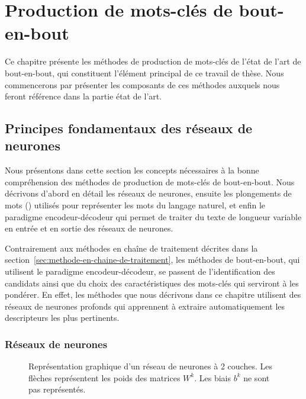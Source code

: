 \chapter{Production de mots-clés de bout-en-bout} \label{chap:kw_production}

Ce chapitre présente les méthodes de production de mots-clés de l'état de l'art de bout-en-bout, qui constituent l'élément principal de ce travail de thèse. 
Nous commencerons par présenter les composants de ces méthodes auxquels nous feront référence dans la partie état de l'art.

\section{Principes fondamentaux des réseaux de neurones}

Nous présentons dans cette section les concepts nécessaires à la bonne compréhension des méthodes de production de mots-clés de bout-en-bout.
Nous décrivons d'abord en détail les réseaux de neurones, ensuite les plongements de mots () utilisés pour représenter les mots du langage naturel, et enfin le paradigme encodeur-décodeur qui permet de traiter du texte de longueur variable en entrée et en sortie des réseaux de neurones.

Contrairement aux méthodes en chaîne de traitement décrites dans la section~\ref{sec:methode-en-chaine-de-traitement}, les méthodes de bout-en-bout, qui utilisent le paradigme encodeur-décodeur, se passent de l'identification des candidats ainsi que du choix des caractéristiques des mots-clés qui serviront à les pondérer.
En effet, les méthodes que nous décrivons dans ce chapitre utilisent des réseaux de neurones profonds qui apprennent à extraire automatiquement les descripteurs  les plus pertinents.


\subsection{Réseaux de neurones}
\label{sub:neural_network}

\begin{figure}
    \centering
    
    \caption{Représentation graphique d'un réseau de neurones à 2 couches. Les flèches représentent les poids des matrices $W^k$. Les biais $b^k$ ne sont pas représentés.}
    \label{fig:ex_nn_simple}
\end{figure}

